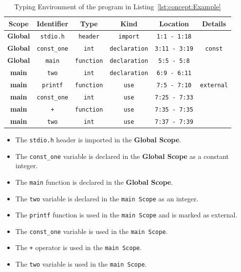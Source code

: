 \begin{table}[t]
    \centering
    \begin{tabular}{ c c c c c c }
        \toprule  \textbf{Scope} & \textbf{Identifier} & \textbf{Type} & \textbf{Kind} & \textbf{Location} & \textbf{Details} \\
        \midrule
        \textbf{Global} & \texttt{stdio.h} & \texttt{header} & \texttt{import} & \texttt{1:1 - 1:18} &  \\
        \textbf{Global} & \texttt{const\_one} & \texttt{int} & \texttt{declaration} & \texttt{3:11 - 3:19} & \texttt{const} \\
        \textbf{Global} & \texttt{main} & \texttt{function} & \texttt{declaration} & \texttt{5:5 - 5:8} &  \\
        \textbf{main} & \texttt{two} & \texttt{int} & \texttt{declaration} & \texttt{6:9 - 6:11} & \\
        \textbf{main} & \texttt{printf} & \texttt{function} & \texttt{use} & \texttt{7:5 - 7:10} & \texttt{external} \\
        \textbf{main} & \texttt{const\_one} & \texttt{int} & \texttt{use} & \texttt{7:25 - 7:33} &  \\
        \textbf{main} & \texttt{+} & \texttt{function} & \texttt{use} & \texttt{7:35 - 7:35} &  \\
        \textbf{main} & \texttt{two} & \texttt{int} & \texttt{use} & \texttt{7:37 - 7:39} &  \\
        \bottomrule
    \end{tabular}
    \caption{Typing Environment of the program in Listing~\ref{lst:concept:Example}}
    \label{tab:concept:Example}
\end{table}

\begin{itemize}
    \item The \texttt{stdio.h} header is imported in the \textbf{Global Scope}.
    \item The \texttt{const\_one} variable is declared in the \textbf{Global Scope} as a constant integer.
    \item The \texttt{main} function is declared in the \textbf{Global Scope}.
    \item The \texttt{two} variable is declared in the \texttt{main Scope} as an integer.
    \item The \texttt{printf} function is used in the \texttt{main Scope} and is marked as external.
    \item The \texttt{const\_one} variable is used in the \texttt{main Scope}.
    \item The \texttt{+} operator is used in the \texttt{main Scope}.
    \item The \texttt{two} variable is used in the \texttt{main Scope}.
\end{itemize}

